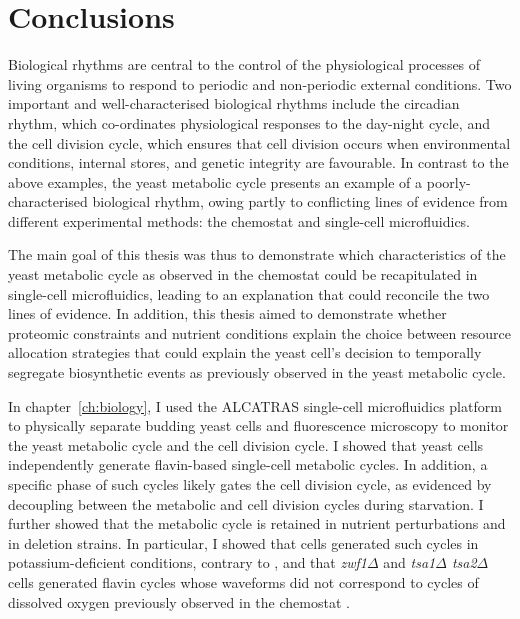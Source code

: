 \chapter{Conclusions}
\label{ch:concl}


Biological rhythms are central to the control of the physiological processes of living organisms to respond to periodic and non-periodic external conditions.
Two important and well-characterised biological rhythms include the circadian rhythm, which co-ordinates physiological responses to the day-night cycle, and the cell division cycle, which ensures that cell division occurs when environmental conditions, internal stores, and genetic integrity are favourable.
In contrast to the above examples, the yeast metabolic cycle presents an example of a poorly-characterised biological rhythm, owing partly to conflicting lines of evidence from different experimental methods: the chemostat and single-cell microfluidics.

The main goal of this thesis was thus to demonstrate which characteristics of the yeast metabolic cycle as observed in the chemostat could be recapitulated in single-cell microfluidics, leading to an explanation that could reconcile the two lines of evidence.
In addition, this thesis aimed to demonstrate whether proteomic constraints and nutrient conditions explain the choice between resource allocation strategies that could explain the yeast cell's decision to temporally segregate biosynthetic events as previously observed in the yeast metabolic cycle.

In chapter~\ref{ch:biology}, I used the ALCATRAS \parencite{craneMicrofluidicSystemStudying2014} single-cell microfluidics platform to physically separate budding yeast cells and fluorescence microscopy to monitor the yeast metabolic cycle and the cell division cycle.
I showed that yeast cells independently generate flavin-based single-cell metabolic cycles.
In addition, a specific phase of such cycles likely gates the cell division cycle, as evidenced by decoupling between the metabolic and cell division cycles during starvation.
I further showed that the metabolic cycle is retained in nutrient perturbations and in deletion strains.
In particular, I showed that cells generated such cycles in potassium-deficient conditions, contrary to \textcite{oneillEukaryoticCellBiology2020}, and that \textit{zwf1$\Delta$} and \textit{tsa1$\Delta$ tsa2$\Delta$} cells generated flavin cycles whose waveforms did not correspond to cycles of dissolved oxygen previously observed in the chemostat \parencite{tuCyclicChangesMetabolic2007,caustonMetabolicCyclesYeast2015}.

